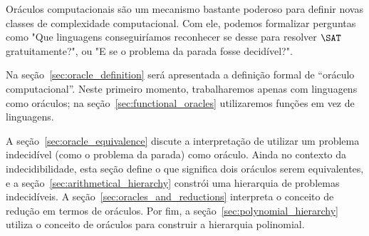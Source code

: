 Oráculos computacionais são um mecanismo bastante poderoso
para definir novas classes de complexidade computacional.
Com ele,
podemos formalizar perguntas como
"Que linguagens conseguiríamos reconhecer
se desse para resolver $\SAT$ gratuitamente?",
ou "E se o problema da parada fosse decidível?".

Na seção~\ref{sec:oracle_definition} será apresentada a definição formal
de ``oráculo computacional''.
Neste primeiro momento,
trabalharemos apenas com linguagens como oráculos;
na seção~\ref{sec:functional_oracles}
utilizaremos funções em vez de linguagens.

A seção~\ref{sec:oracle_equivalence}
discute a interpretação de utilizar um problema indecidível
(como o problema da parada)
como oráculo.
Ainda no contexto da indecidibilidade,
esta seção define o que significa dois oráculos serem equivalentes,
e a seção~\ref{sec:arithmetical_hierarchy}
constrói uma hierarquia de problemas indecidíveis.
A seção~\ref{sec:oracles_and_reductions}
interpreta o conceito de redução em termos de oráculos.
Por fim, a seção~\ref{sec:polynomial_hierarchy}
utiliza o conceito de oráculos para construir a hierarquia polinomial.
